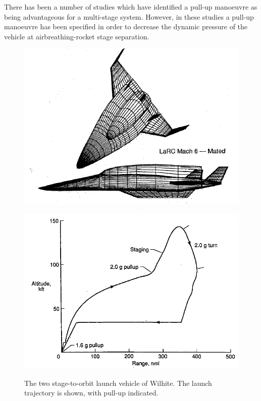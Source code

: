 There has been a number of studies which have identified a pull-up manoeuvre as being advantageous for a multi-stage system\cite{Tsuchiya2005,Wilhite1991,Mehta2001}. However, in these studies a pull-up manoeuvre has been specified in order to decrease the dynamic pressure of the vehicle at airbreathing-rocket stage separation. 
\begin{figure}
\centering
\begin{minipage}[b]{0.45\textwidth}
	\centering
	\includegraphics[width=\linewidth]{"figures/2_literature-review/Wilhite Booster Vehicle"}

	\label{fig:WilhiteVehicle}
\end{minipage}	
\begin{minipage}[b]{0.45\textwidth}
\includegraphics[width=\linewidth]{"figures/2_literature-review/WilHite Booster Trajectory"}

\label{fig:WilHiteTrajectory}
\end{minipage}
\caption{The two stage-to-orbit launch vehicle of Wilhite\cite{Wilhite1991}. The launch trajectory is shown, with pull-up indicated.}
\label{fig:Wilhite}
\end{figure}
